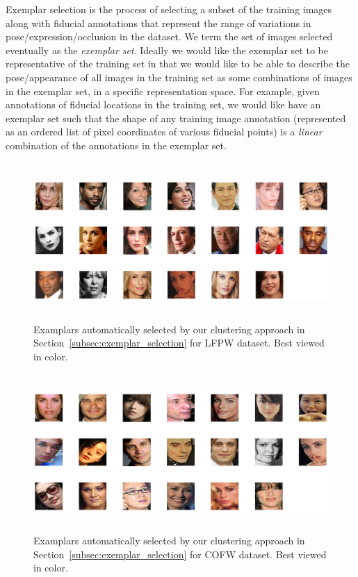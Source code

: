 \label{subsec:exemplar_selection}

Exemplar selection is the process of selecting a subset of the training images along with
fiducial annotations that represent the range of variations in pose/expression/occlusion in the 
dataset. We term the set of images selected eventually as the \emph{exemplar set}. Ideally we would
like the exemplar set to be representative of the training set in that we would like to be able
to describe the pose/appearance of all images in the training set as some combinations of images
in the exemplar set, in a specific representation space. For example, given annotations of fiducial
locations in the training set, we would like have an exemplar set such that the shape of any training image
annotation (represented as an ordered list of pixel coordinates of various fiducial points) 
is a \emph{linear} combination of the annotations in the exemplar set.

\begin{figure}[!ht]
  \centering
  \includegraphics[width=15cm,height=6cm]{fid/figures/lfpw_exemplars_selected2.png}
  \caption{Examplars automatically selected by our clustering approach in
  Section~\ref{subsec:exemplar_selection} for LFPW dataset. Best viewed in color.}
  \label{fig:cofw_lfpw_exemplars}
\end{figure}
\begin{figure}[!ht]
  \centering
  \includegraphics[width=15cm,height=6cm]{fid/figures/cofw_exemplars_selected2.png}
  \caption{Examplars automatically selected by our clustering approach in
  Section~\ref{subsec:exemplar_selection} for COFW dataset. Best viewed in color.}
  \label{fig:cofw_exemplars}
\end{figure}

